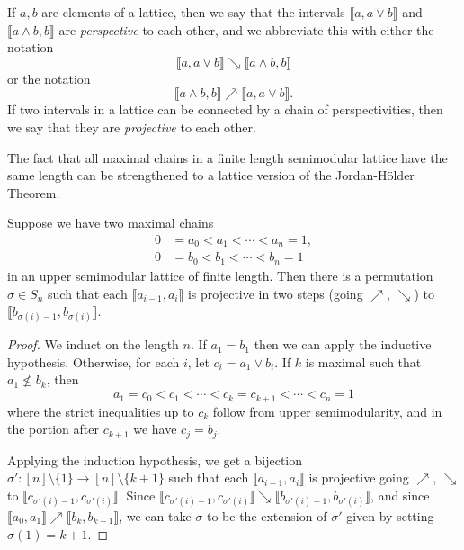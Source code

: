 \documentclass[letterpaper,11pt]{article}
\begin{document}
\begin{defn} If $a, b$ are elements of a lattice, then we say that the intervals $\llbracket a, a \vee b \rrbracket$ and $\llbracket a \wedge b, b\rrbracket$ are \emph{perspective} to each other, and we abbreviate this with either the notation
\[
\llbracket a, a \vee b \rrbracket \searrow \llbracket a \wedge b, b \rrbracket
\]
or the notation
\[
\llbracket a \wedge b, b \rrbracket \nearrow \llbracket a, a \vee b\rrbracket.
\]
If two intervals in a lattice can be connected by a chain of perspectivities, then we say that they are \emph{projective} to each other.
\end{defn}

The fact that all maximal chains in a finite length semimodular lattice have the same length can be strengthened to a lattice version of the Jordan-H\"older Theorem.

\begin{thm} Suppose we have two maximal chains
\begin{align*}
0 &= a_0 < a_1 < \cdots < a_n = 1,\\
0 &= b_0 < b_1 < \cdots < b_n = 1
\end{align*}
in an upper semimodular lattice of finite length. Then there is a permutation $\sigma \in S_n$ such that each $\llbracket a_{i-1}, a_i\rrbracket$ is projective in two steps (going $\nearrow$, $\searrow$) to $\llbracket b_{\sigma(i)-1}, b_{\sigma(i)} \rrbracket$.
\end{thm}
\begin{proof} We induct on the length $n$. If $a_1 = b_1$ then we can apply the inductive hypothesis. Otherwise, for each $i$, let $c_i = a_1 \vee b_i$. If $k$ is maximal such that $a_1 \not\le b_k$, then
\[
a_1 = c_0 < c_1 < \cdots < c_k = c_{k+1} < \cdots < c_n = 1
\]
where the strict inequalities up to $c_k$ follow from upper semimodularity, and in the portion after $c_{k+1}$ we have $c_j = b_j$.

Applying the induction hypothesis, we get a bijection $\sigma' : [n]\setminus\{1\} \rightarrow [n]\setminus\{k+1\}$ such that each $\llbracket a_{i-1}, a_i\rrbracket$ is projective going $\nearrow$, $\searrow$ to $\llbracket c_{\sigma'(i)-1}, c_{\sigma'(i)} \rrbracket$. Since $\llbracket c_{\sigma'(i)-1}, c_{\sigma'(i)} \rrbracket \searrow \llbracket b_{\sigma'(i)-1}, b_{\sigma'(i)} \rrbracket$, and since $\llbracket a_0, a_1 \rrbracket \nearrow \llbracket b_k, b_{k+1}\rrbracket$, we can take $\sigma$ to be the extension of $\sigma'$ given by setting $\sigma(1) = k+1$.
\end{proof}
\end{document}
